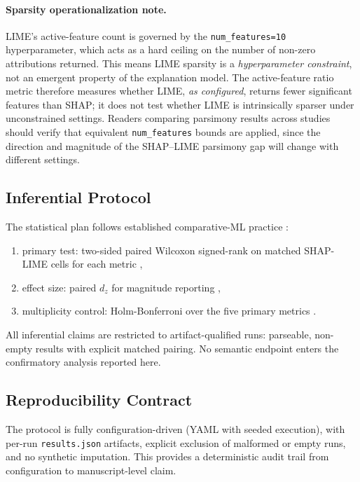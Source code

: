 \documentclass[10pt]{article}
\begin{document}
\paragraph{Sparsity operationalization note.}
LIME's active-feature count is governed by the \texttt{num\_features=10} hyperparameter, which acts as a hard ceiling on the number of non-zero attributions returned. This means LIME sparsity is a \emph{hyperparameter constraint}, not an emergent property of the explanation model. The active-feature ratio metric therefore measures whether LIME, \emph{as configured}, returns fewer significant features than SHAP; it does not test whether LIME is intrinsically sparser under unconstrained settings. Readers comparing parsimony results across studies should verify that equivalent \texttt{num\_features} bounds are applied, since the direction and magnitude of the SHAP--LIME parsimony gap will change with different settings.

\subsection{Inferential Protocol}
\label{sec:inference}

The statistical plan follows established comparative-ML practice
\citep{demsar2006statistical}:
\begin{enumerate}[leftmargin=*]
\item primary test: two-sided paired Wilcoxon signed-rank on matched
SHAP-LIME cells for each metric \citep{wilcoxon1945individual},
\item effect size: paired $d_z$ for magnitude reporting
\citep{lakens2013calculating},
\item multiplicity control: Holm-Bonferroni over the five primary metrics
\citep{holm1979simple}.
\end{enumerate}

All inferential claims are restricted to artifact-qualified runs:
parseable, non-empty results with explicit matched pairing. No semantic
endpoint enters the confirmatory analysis reported here.

\subsection{Reproducibility Contract}
\label{sec:reproducibility}

The protocol is fully configuration-driven (YAML with seeded execution),
with per-run \texttt{results.json} artifacts, explicit exclusion of
malformed or empty runs, and no synthetic imputation. This provides a
deterministic audit trail from configuration to manuscript-level claim.
\end{document}
